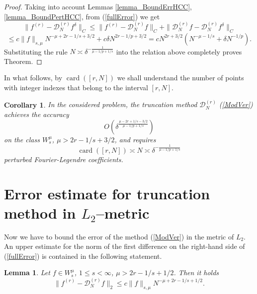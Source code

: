 \documentclass[10pt]{extarticle}
\DeclareMathOperator{\card}{card}
\newtheorem{lemma}[theorem]{Lemma}
\newtheorem{corollary}[theorem]{Corollary}
\newtheorem{remark}[theorem]{Remark}
\begin{document}
\begin{proof}
Taking into account Lemmas \ref{lemma_BoundErrHCC}, \ref{lemma_BoundPertHCC}, from (\ref{fullError}) we get
$$
\|f^{(r)} - \mathcal{D}^{(r)}_N f^\delta\|_C \leq \|f^{(r)}-\mathcal{D}_N^{(r)} f\|_C +
\|\mathcal{D}^{(r)}_N f - \mathcal{D}^{(r)}_N f^\delta\|_C
$$
$$
\leq c\|f\|_{s,\mu} N^{-\mu+2r-1/s+3/2} + c\delta N^{2r-1/p+3/2}
= cN^{2r+3/2} \left(N^{-\mu-1/s} + \delta N^{-1/p}\right).
$$
Substituting the rule $N\asymp \delta^{-\frac{1}{\mu-1/p+1/s}}$ into the relation above completely proves Theorem.
\end{proof}

In what follows, by $\card([r,N])$ we shall understand the number of points with integer indexes that belong to the interval $[r,N]$.

\begin{corollary} \label{Cor2}
In the considered problem, the truncation method $\mathcal{D}^{(r)}_{N}$ (\ref{ModVer})
achieves the accuracy
	$$
	O\left(\delta^{\frac{\mu-2r+1/s-3/2}{\mu-1/p+1/s}}\right)
	$$
	on the class $W^{\mu}_{s}$, $\mu>2r-1/s+3/2$, and requires
	$$
	\card([r,N]) \asymp
	N \asymp \delta^{-\frac{1}{\mu-1/p+1/s}}
	$$
	perturbed Fourier-Legendre coefficients.
\end{corollary}

\section{Error estimate for truncation method in $L_2$--metric}

Now we have to bound the error of the method (\ref{ModVer}) in the metric of $L_2$. An upper estimate for the norm of the first difference on the right-hand side of (\ref{fullError}) is contained in the following statement.

\begin{lemma}\label{lemma_BoundErrHC}
	Let $f\in W^\mu_{s}$, $1\leq s< \infty$, $\mu>2r-1/s+1/2$. Then it holds
	$$
	\|f^{(r)}-\mathcal{D}_N^{(r)} f\|_2 \leq c\|f\|_{s,\mu} N^{-\mu+2r-1/s+1/2}.
	$$
\end{lemma}
\end{document}
